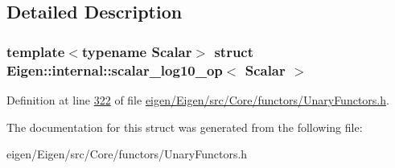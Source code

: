 \subsection{Detailed Description}
\subsubsection*{template$<$typename Scalar$>$\newline
struct Eigen\+::internal\+::scalar\+\_\+log10\+\_\+op$<$ Scalar $>$}



Definition at line \hyperlink{eigen_2_eigen_2src_2_core_2functors_2_unary_functors_8h_source_l00322}{322} of file \hyperlink{eigen_2_eigen_2src_2_core_2functors_2_unary_functors_8h_source}{eigen/\+Eigen/src/\+Core/functors/\+Unary\+Functors.\+h}.



The documentation for this struct was generated from the following file\+:\begin{DoxyCompactItemize}
\item 
eigen/\+Eigen/src/\+Core/functors/\+Unary\+Functors.\+h\end{DoxyCompactItemize}
